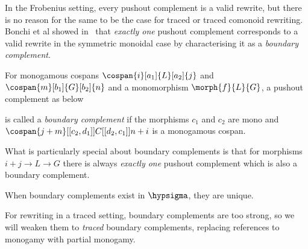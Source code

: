 In the Frobenius setting, every pushout complement is a valid rewrite, but there
is no reason for the same to be the case for traced or traced comonoid
rewriting.
Bonchi et al showed in~\cite{bonchi2022stringa} that \emph{exactly one} pushout
complement corresponds to a valid rewrite in the symmetric monoidal case by
characterising it as a \emph{boundary complement}.

\begin{definition}
    For monogamous cospans \(
    \cospan{i}[a_1]{L}[a_2]{j}
    \) and \(
    \cospan{m}[b_1]{G}[b_2]{n}
    \) and a monomorphism \(\morph{f}{L}{G}\), a pushout complement as below
    \begin{center}
    \end{center}
    is called a \emph{boundary complement} if the morphisms \(c_1\) and \(c_2\) are
    mono and \(
    \cospan{j + m}[[c_2,d_1]]{C}[[d_2,c_1]]{n + i}
    \) is a monogamous cospan.
\end{definition}

What is particularly special about boundary complements is that for morphisms
\(i + j \to L \to G\) there is always \emph{exactly one} pushout
complement which is also a boundary complement.

\begin{proposition}
    When boundary complements exist in \(\hypsigma\), they are unique.
\end{proposition}

For rewriting in a traced setting, boundary complements are too strong, so we
will weaken them to \emph{traced} boundary complements, replacing references to
monogamy with partial monogamy.

